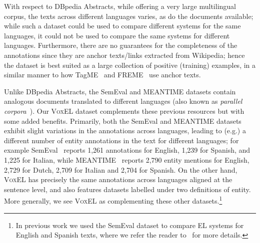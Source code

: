 \documentclass{llncs}
\begin{document}

With respect to DBpedia Abstracts, while offering a very large multilingual corpus, the texts across different languages varies, as do the documents available; while such a dataset could be used to compare different systems for the same languages, it could not be used to compare the same systems for different languages. Furthermore, there are no guarantees for the completeness of the annotations since they are anchor texts/links extracted from Wikipedia; hence the dataset is best suited as a large collection of positive (training) examples, in a similar manner to how TagME~\cite{ferragina2010tagme} and FREME~\cite{freme-ner2016} use anchor texts.

Unlike DBpedia Abstracts, the SemEval and MEANTIME datasets contain analogous documents translated to different languages (also known as \textit{parallel corpora}~\cite{moro2015semeval}). Our \textsc{VoxEL} dataset complements these previous resources but with some added benefits. Primarily, both the SemEval and MEANTIME datasets exhibit slight variations in the annotations across languages, leading to (e.g.) a different number of entity annotations in the text for different languages; for example SemEval~\cite{moro2015semeval} reports 1,261 annotations for English, 1,239 for Spanish, and 1,225 for Italian, while MEANTIME~\cite{meantime2016} reports 2,790 entity mentions for English, 2,729 for Dutch, 2,709 for Italian and 2,704 for Spanish. On the other hand, \textsc{VoxEL} has precisely the same annotations across languages aligned at the sentence level, and also features datasets labelled under two definitions of entity. More generally, we see \textsc{VoxEL} as complementing these other datasets.\footnote{In previous work we used the SemEval dataset to compare EL systems for English and Spanish texts, where we refer the reader to~\cite{Rosales-MendezP17} for more details.}


\end{document}
